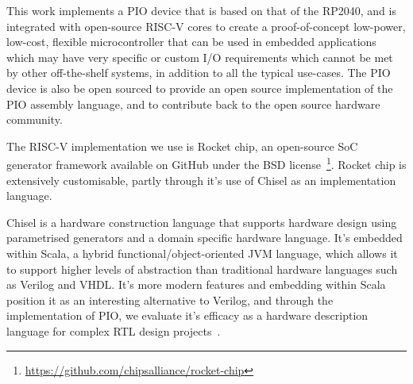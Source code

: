 This work implements a PIO device that is based on that of the RP2040, and is integrated with open-source RISC-V cores to create a proof-of-concept low-power, low-cost, flexible microcontroller that can be used in embedded applications which may have very specific or custom I/O requirements which cannot be met by other off-the-shelf systems, in addition to all the typical use-cases. The PIO device is also be open sourced to provide an open source implementation of the PIO assembly language, and to contribute back to the open source hardware community.

The RISC-V implementation we use is Rocket chip, an open-source SoC generator framework available on GitHub under the BSD license~\footnote{\url{https://github.com/chipsalliance/rocket-chip}}. Rocket chip is extensively customisable, partly through it's use of Chisel as an implementation language.

Chisel is a hardware construction language that supports hardware design using parametrised generators and a domain specific hardware language. It's embedded within Scala, a hybrid functional/object-oriented JVM language, which allows it to support higher levels of abstraction than traditional hardware languages such as Verilog and VHDL. It's more modern features and embedding within Scala position it as an interesting alternative to Verilog, and through the implementation of PIO, we evaluate it's efficacy as a hardware description language for complex RTL design projects~\cite{chisel}.